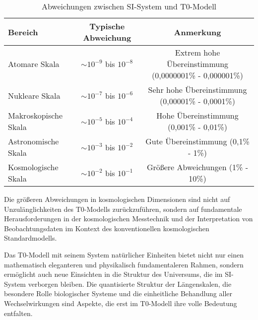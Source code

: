 \documentclass[12pt,a4paper]{article}
\begin{document}
\begin{table}[H]
	\centering
	\begin{adjustbox}{width=0.95\textwidth}
		\begin{tabular}{lcc}
			\toprule
			\textbf{Bereich} & \textbf{Typische Abweichung} & \textbf{Anmerkung} \\
			\midrule
			Atomare Skala & $\sim10^{-9}$ bis $10^{-8}$ & Extrem hohe Übereinstimmung (0,0000001\% - 0,000001\%) \\
			Nukleare Skala & $\sim10^{-7}$ bis $10^{-6}$ & Sehr hohe Übereinstimmung (0,00001\% - 0,0001\%) \\
			Makroskopische Skala & $\sim10^{-5}$ bis $10^{-4}$ & Hohe Übereinstimmung (0,001\% - 0,01\%) \\
			Astronomische Skala & $\sim10^{-3}$ bis $10^{-2}$ & Gute Übereinstimmung (0,1\% - 1\%) \\
			Kosmologische Skala & $\sim10^{-2}$ bis $10^{-1}$ & Größere Abweichungen (1\% - 10\%) \\
			\bottomrule
		\end{tabular}
	\end{adjustbox}
	\caption{Abweichungen zwischen SI-System und T0-Modell}
	\label{tab:abweichungen}
\end{table}

Die größeren Abweichungen in kosmologischen Dimensionen sind nicht auf Unzulänglichkeiten des T0-Modells zurückzuführen, sondern auf fundamentale Herausforderungen in der kosmologischen Messtechnik und der Interpretation von Beobachtungsdaten im Kontext des konventionellen kosmologischen Standardmodells.

Das T0-Modell mit seinem System natürlicher Einheiten bietet nicht nur einen mathematisch eleganteren und physikalisch fundamentaleren Rahmen, sondern ermöglicht auch neue Einsichten in die Struktur des Universums, die im SI-System verborgen bleiben. Die quantisierte Struktur der Längenskalen, die besondere Rolle biologischer Systeme und die einheitliche Behandlung aller Wechselwirkungen sind Aspekte, die erst im T0-Modell ihre volle Bedeutung entfalten.
\end{document}
